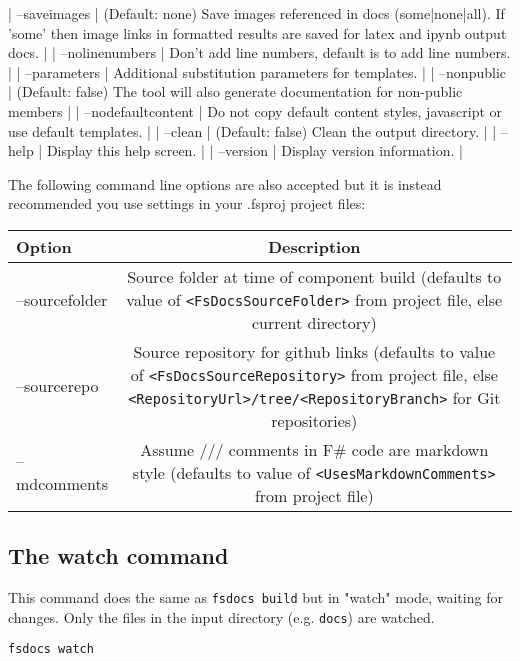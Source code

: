 \documentclass{article}
\begin{document}
| --saveimages        |        (Default: none) Save images referenced in docs (some|none|all). If 'some' then image links in formatted results are saved for latex and ipynb output docs. |
| --nolinenumbers       |      Don't add line numbers, default is to add line numbers. |
| --parameters            |    Additional substitution parameters for templates. |
| --nonpublic           |      (Default: false) The tool will also generate documentation for non-public members |
| --nodefaultcontent      |    Do not copy default content styles, javascript or use default templates. |
| --clean                 |    (Default: false) Clean the output directory. |
| --help                  |    Display this help screen. |
| --version               |    Display version information. |


The following command line options are also accepted but it is instead recommended you use
settings in your .fsproj project files:
\begin{tabular}{|l|c|}\hline
\textbf{Option} & \textbf{Description}\\ \hline\hline
--sourcefolder & Source folder at time of component build (defaults to value of \texttt{<FsDocsSourceFolder>} from project file, else current directory)\\ \hline
--sourcerepo & Source repository for github links (defaults to value of \texttt{<FsDocsSourceRepository>} from project file, else \texttt{<RepositoryUrl>/tree/<RepositoryBranch>} for Git repositories)\\ \hline
--mdcomments & Assume /// comments in F\# code are markdown style (defaults to value of \texttt{<UsesMarkdownComments>} from project file)\\ \hline
\end{tabular}

\subsection*{The watch command}



This command does the same as \texttt{fsdocs build} but in "watch" mode, waiting for changes. Only the files in the input
directory (e.g. \texttt{docs}) are watched.
\begin{lstlisting}
fsdocs watch

\end{lstlisting}
\end{document}
